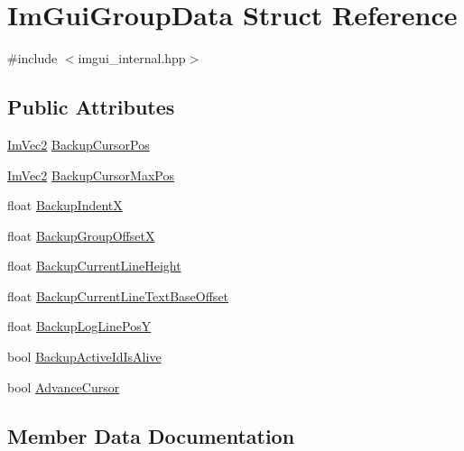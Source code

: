 \hypertarget{struct_im_gui_group_data}{}\section{Im\+Gui\+Group\+Data Struct Reference}
\label{struct_im_gui_group_data}


{\ttfamily \#include $<$imgui\+\_\+internal.\+hpp$>$}

\subsection*{Public Attributes}
\begin{DoxyCompactItemize}
\item 
\hyperlink{struct_im_vec2}{Im\+Vec2} \hyperlink{struct_im_gui_group_data_a8b29e2d9081876fd4847b1cd86c60500}{Backup\+Cursor\+Pos}
\item 
\hyperlink{struct_im_vec2}{Im\+Vec2} \hyperlink{struct_im_gui_group_data_abb83c4db050ef7d20485902cc14c4a0d}{Backup\+Cursor\+Max\+Pos}
\item 
float \hyperlink{struct_im_gui_group_data_a9d39092c1c154ba4809ae79e47baeb64}{Backup\+IndentX}
\item 
float \hyperlink{struct_im_gui_group_data_a0cee1b14b574a4bf883ceb1be58a9332}{Backup\+Group\+OffsetX}
\item 
float \hyperlink{struct_im_gui_group_data_a6e17deccf50138bdf436fa172bb453e2}{Backup\+Current\+Line\+Height}
\item 
float \hyperlink{struct_im_gui_group_data_a3745219bd1f4c6ee5080d8d0aaa8a712}{Backup\+Current\+Line\+Text\+Base\+Offset}
\item 
float \hyperlink{struct_im_gui_group_data_af67f52c70f74a3b7bce8ce46affc856b}{Backup\+Log\+Line\+PosY}
\item 
bool \hyperlink{struct_im_gui_group_data_ac27968bcfd94ba2e4b1543b95d032f35}{Backup\+Active\+Id\+Is\+Alive}
\item 
bool \hyperlink{struct_im_gui_group_data_a2bfc0ee6236ec2ace16634a34eda72d7}{Advance\+Cursor}
\end{DoxyCompactItemize}


\subsection{Member Data Documentation}
\hypertarget{struct_im_gui_group_data_a2bfc0ee6236ec2ace16634a34eda72d7}{}\label{struct_im_gui_group_data_a2bfc0ee6236ec2ace16634a34eda72d7} 

